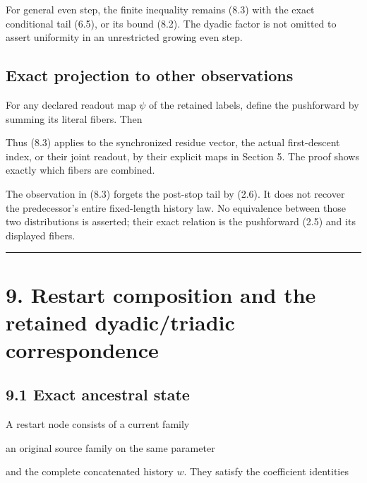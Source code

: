 For general even step, the finite inequality remains (8.3) with the
exact conditional tail (6.5), or its bound (8.2). The dyadic factor is
not omitted to assert uniformity in an unrestricted growing even step.

\subsection{Exact projection to other observations}

For any declared readout map \(\psi\) of the retained labels, define the
pushforward by summing its literal fibers. Then


Thus (8.3) applies to the synchronized residue vector, the actual
first-descent index, or their joint readout, by their explicit maps in
Section 5. The proof shows exactly which fibers are combined.

The observation in (8.3) forgets the post-stop tail by (2.6). It does
not recover the predecessor's entire fixed-length history law. No
equivalence between those two distributions is asserted; their exact
relation is the pushforward (2.5) and its displayed fibers.

\begin{center}\rule{0.5\linewidth}{0.5pt}\end{center}

\section{9. Restart composition and the retained dyadic/triadic
correspondence}

\subsection{9.1 Exact ancestral state}

A restart node consists of a current family


an original source family on the same parameter


and the complete concatenated history \(w\). They satisfy the
coefficient identities


